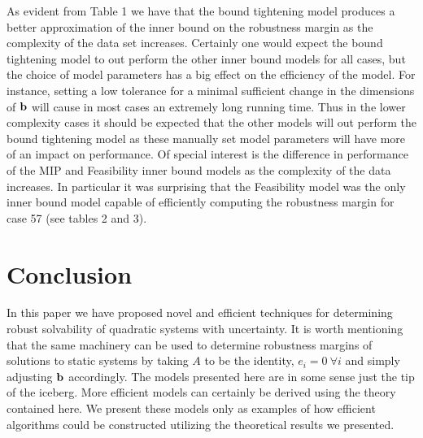 \documentclass[11pt]{article}
\theoremstyle{plain}
\theoremstyle{definition}
\theoremstyle{remark}
\begin{document}

As evident from Table 1 we have that the bound tightening model produces a better approximation of the inner bound on the robustness margin as the complexity of the data set increases. 
Certainly one would expect the bound tightening model to out perform the other inner bound models for all cases, but the choice of model parameters has a big effect on the efficiency of the model. 
For instance, setting a low tolerance for a minimal sufficient change in the dimensions of $\bold b$ will cause in most cases an extremely long running time. 
Thus in the lower complexity cases it should be expected that the other models will out perform the bound tightening model as these manually set model parameters will have more of an impact on performance. 
Of special interest is the difference in performance of the MIP and Feasibility inner bound models as the complexity of the data increases. 
In particular it was surprising that the Feasibility model was the only inner bound model capable of efficiently computing the robustness margin for case 57 (see tables 2 and 3). 

\section{Conclusion}

In this paper we have proposed novel and efficient techniques for determining robust solvability of quadratic systems with uncertainty. 
It is worth mentioning that the same machinery can be used to determine robustness margins of solutions to static systems by taking $A$ to be the identity, $e_i=0 \ \forall i$ and simply adjusting $\bold b$ accordingly. 
The models presented here are in some sense just the tip of the iceberg. 
More efficient models can certainly be derived using the theory contained here. 
We present these models only as examples of how efficient algorithms could be constructed utilizing the theoretical results we presented. 


\end{document}
